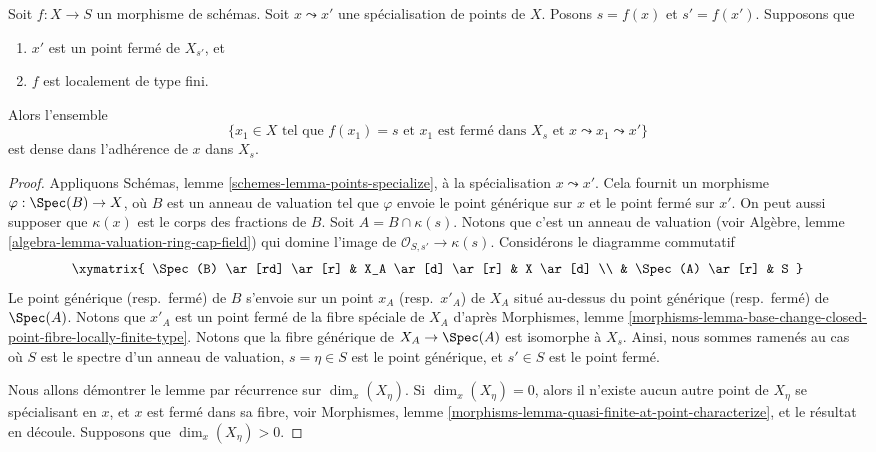 \begin{lemma}
\label{lemma-closed-point-nearby-fibre}
Soit $f : X \to S$ un morphisme de schémas.
Soit $x \leadsto x'$ une spécialisation de points de $X$.
Posons $s = f(x)$ et $s' = f(x')$.
Supposons que
\begin{enumerate}
\item $x'$ est un point fermé de $X_{s'}$, et
\item $f$ est localement de type fini.
\end{enumerate}
Alors l'ensemble
$$
\{x_1 \in X
\text{ tel que }
f(x_1) = s
\text{ et }
x_1\text{ est fermé dans }X_s
\text{ et }
x \leadsto x_1 \leadsto x'
\}
$$
est dense dans l'adhérence de $x$ dans $X_s$.
\end{lemma}

\begin{proof}
Appliquons
Schémas, lemme \ref{schemes-lemma-points-specialize},
à la spécialisation $x \leadsto x'$.
Cela fournit un morphisme $\varphi : \Spec(B) \to X$,
où $B$ est un anneau de valuation tel que $\varphi$ envoie le
point générique sur $x$ et le point fermé sur $x'$. On peut aussi
supposer que $\kappa(x)$ est le corps des fractions de $B$.
Soit $A = B \cap \kappa(s)$. Notons que c'est un anneau de valuation (voir
Algèbre, lemme \ref{algebra-lemma-valuation-ring-cap-field})
qui domine l'image de $\mathcal{O}_{S, s'} \to \kappa(s)$.
Considérons le diagramme commutatif
$$
\xymatrix{
\Spec(B) \ar[rd] \ar[r] &
X_A \ar[d] \ar[r] & X \ar[d] \\
& \Spec(A) \ar[r] & S
}
$$
Le point générique (resp.\ fermé) de $B$ s'envoie sur un point $x_A$
(resp.\ $x'_A$) de $X_A$ situé au-dessus du point générique (resp.\ fermé)
de $\Spec(A)$. Notons que $x'_A$ est un point fermé
de la fibre spéciale de $X_A$ d'après
Morphismes,
lemme \ref{morphisms-lemma-base-change-closed-point-fibre-locally-finite-type}.
Notons que la fibre générique de $X_A \to \Spec(A)$ est isomorphe
à $X_s$. Ainsi, nous sommes ramenés au cas où $S$ est
le spectre d'un anneau de valuation, $s = \eta \in S$ est le point générique, et
$s' \in S$ est le point fermé.

\medskip\noindent
Nous allons démontrer le lemme par récurrence sur $\dim_x(X_\eta)$.
Si $\dim_x(X_\eta) = 0$, alors il n'existe aucun autre point de $X_\eta$
se spécialisant en $x$, et $x$ est fermé dans sa fibre, voir
Morphismes, lemme \ref{morphisms-lemma-quasi-finite-at-point-characterize},
et le résultat en découle. Supposons que $\dim_x(X_\eta) > 0$.


\end{proof}
